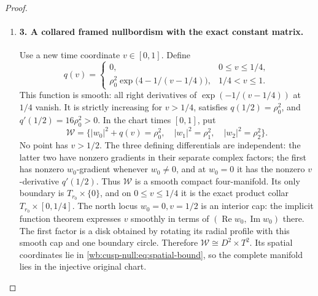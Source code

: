 \begin{proof}
\begin{enumerate}[label=\arabic*.,leftmargin=*]
\item \paragraph{3. A collared framed nullbordism with the exact constant matrix.}
Use a new time coordinate \(v\in[0,1]\). Define
\begin{equation}
 q(v)=
 \begin{cases}
 0,&0\leq v\leq1/4,\\
 \rho_0^2\exp\bigl(4-1/(v-1/4)\bigr),&1/4<v\leq1.
 \end{cases}
 \label{wb:cusp-null:eq:q}
\end{equation}
This function is smooth: all right derivatives of
\(\exp(-1/(v-1/4))\) at \(1/4\) vanish. It is strictly increasing
for \(v>1/4\), satisfies \(q(1/2)=\rho_0^2\), and
\(q'(1/2)=16\rho_0^2>0\).
In the chart times \([0,1]\), put
\begin{equation}
 \mathcal W=
 \{|w_0|^2+q(v)=\rho_0^2,\quad
       |w_1|^2=\rho_1^2,\quad|w_2|^2=\rho_2^2\}.
 \label{wb:cusp-null:eq:bordism}
\end{equation}
No point has \(v>1/2\). The three defining differentials are independent:
the latter two have nonzero gradients in their separate complex factors;
the first has nonzero \(w_0\)-gradient whenever \(w_0\ne0\), and at
\(w_0=0\) it has the nonzero \(v\)-derivative \(q'(1/2)\).
Thus \(\mathcal W\) is a smooth compact four-manifold. Its only
boundary is \(T_{r_0}\times\{0\}\), and on \(0\leq v\leq1/4\)
it is the exact product collar \(T_{r_0}\times[0,1/4]\).
The north locus \(w_0=0,v=1/2\) is an interior cap: the implicit
function theorem expresses \(v\) smoothly in terms of
\((\operatorname{Re}w_0,\operatorname{Im}w_0)\) there. The first
factor is a disk obtained by rotating its radial profile with this smooth
cap and one boundary circle. Therefore
\(\mathcal W\cong D^2\times T^2\).
Its spatial coordinates lie in \eqref{wb:cusp-null:eq:spatial-bound}, so the complete
manifold lies in the injective original chart.


\end{enumerate}
\end{proof}
